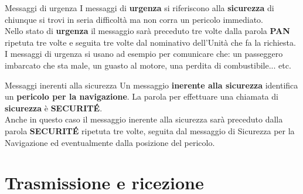 \documentclass[aspectratio=169]{beamer}
\begin{document}
\begin{frame}{Messaggi di urgenza}
	I messaggi di \textbf{urgenza} si riferiscono alla \textbf{sicurezza} di chiunque si trovi in seria difficoltà ma non corra un pericolo immediato.\\
	\smallskip
	Nello stato di \textbf{urgenza} il messaggio sarà preceduto tre volte dalla parola \textbf{PAN} ripetuta tre volte e seguita tre volte dal nominativo dell'Unità che fa la richiesta.\\
	\medskip
	I messaggi di urgenza si usano ad esempio per comunicare che: un passeggero imbarcato che sta male, un guasto al motore, una perdita di combustibile... etc.
\end{frame}

\begin{frame}{Messaggi inerenti alla sicurezza}
Un messaggio \textbf{inerente alla sicurezza} identifica un \textbf{pericolo per la navigazione}. La parola per effettuare una chiamata di \textbf{sicurezza} è \textbf{SECURITÉ}.\\
\smallskip
Anche in questo caso il messaggio inerente alla sicurezza sarà preceduto dalla parola \textbf{SECURITÉ} ripetuta tre volte, seguita dal messaggio di Sicurezza per la Navigazione ed eventualmente dalla posizione del pericolo.
\end{frame}

\section{Trasmissione e ricezione}
\begin{frame}
	\\
\end{frame}
\end{document}
